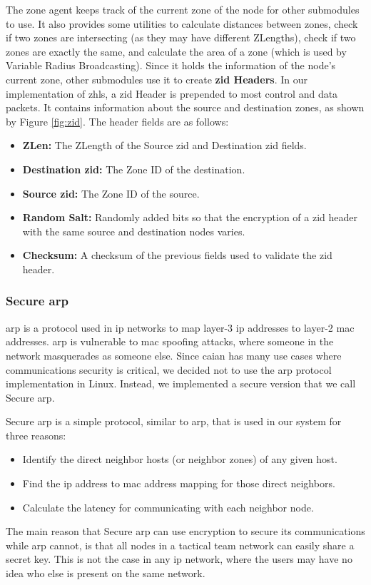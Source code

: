 The zone agent keeps track of the current zone of the node for other submodules to use. It also provides some utilities to calculate distances between zones, check if two zones are intersecting (as they may have different ZLengths), check if two zones are exactly the same, and calculate the area of a zone (which is used by Variable Radius Broadcasting). Since it holds the information of the node's current zone, other submodules use it to create \textbf{\acrshort{zid} Headers}. In our implementation of \acrshort{zhls}, a \acrshort{zid} Header is prepended to most control and data packets. It contains information about the source and destination zones, as shown by Figure \ref{fig:zid}. The header fields are as follows:
\begin{itemize}[itemsep=1pt, topsep=5pt]
    \item \textbf{ZLen:} The ZLength of the Source \acrshort{zid} and Destination \acrshort{zid} fields.
    \item \textbf{Destination \acrshort{zid}:} The Zone ID of the destination.
    \item \textbf{Source \acrshort{zid}:} The Zone ID of the source.
    \item \textbf{Random Salt:} Randomly added bits so that the encryption of a \acrshort{zid} header with the same source and destination nodes varies.
    \item \textbf{Checksum:} A checksum of the previous fields used to validate the \acrshort{zid} header.
\end{itemize}

\subsubsection{Secure \acrshort{arp}}
\qquad \acrfull{arp} is a protocol used in \acrshort{ip} networks to map layer-3 \acrshort{ip} addresses to layer-2 \acrshort{mac} addresses. \acrshort{arp} is vulnerable to \acrshort{mac} spoofing attacks, where someone in the network masquerades as someone else. Since \acrshort{caian} has many use cases where communications security is critical, we decided not to use the \acrshort{arp} protocol implementation in Linux. Instead, we implemented a secure version that we call Secure \acrshort{arp}.

Secure \acrshort{arp} is a simple protocol, similar to \acrshort{arp}, that is used in our system for three reasons:
\begin{itemize}[itemsep=1pt, topsep=5pt]
    \item Identify the direct neighbor hosts (or neighbor zones) of any given host.
    \item Find the \acrshort{ip} address to \acrshort{mac} address mapping for those direct neighbors.
    \item Calculate the latency for communicating with each neighbor node.
\end{itemize}
The main reason that Secure \acrshort{arp} can use encryption to secure its communications while \acrshort{arp} cannot, is that all nodes in a tactical team network can easily share a secret key. This is not the case in any \acrshort{ip} network, where the users may have no idea who else is present on the same network.

